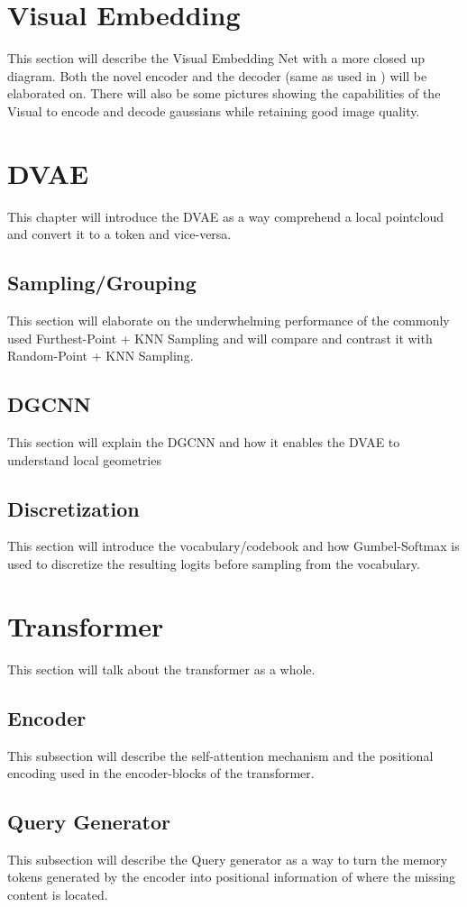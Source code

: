 \section{Visual Embedding}
This section will describe the Visual Embedding Net with a more closed up diagram. Both the novel encoder and the decoder (same as used in \cite{zou2023triplane}) will be elaborated on.
There will also be some pictures showing the capabilities of the Visual to encode and decode gaussians while retaining good image quality.

\section{DVAE}
This chapter will introduce the DVAE \cite{rolfe2017discrete} as a way comprehend a local pointcloud and convert it to a token and vice-versa.
\subsection{Sampling/Grouping}
This section will elaborate on the underwhelming performance of the commonly used Furthest-Point + KNN Sampling and will compare and contrast it with Random-Point + KNN Sampling.
\subsection{DGCNN}
This section will explain the DGCNN \cite{wang2019dynamic} and how it enables the DVAE to understand local geometries
\subsection{Discretization}
This section will introduce the vocabulary/codebook and how Gumbel-Softmax \cite{jang2017categorical} is used to discretize the resulting logits before sampling from the vocabulary.
\section{Transformer}
This section will talk about the transformer as a whole.
\subsection{Encoder}
This subsection will describe the self-attention mechanism and the positional encoding used in the encoder-blocks of the transformer.
\subsection{Query Generator}
This subsection will describe the Query generator as a way to turn the memory tokens generated by the encoder into positional information of where the missing content is located.
